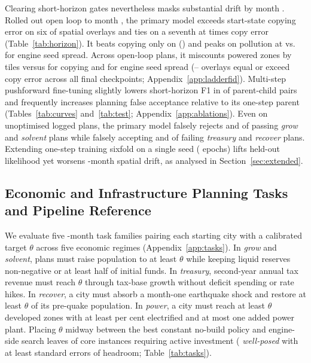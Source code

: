 Clearing short-horizon gates nevertheless masks substantial drift by month \Horizon{}. Rolled out open loop to month \Horizon{}, the primary model exceeds start-state copying error on six of \HorOverlays{} spatial overlays and ties on a seventh at \HorRestMin{} times copy error (Table~\ref{tab:horizon}). It beats copying only on \HorBestOverlay{} (\HorBestRatio{}) and peaks on pollution at \HorPollEmu{} vs.\ \HorPollEng{} for engine seed spread. Across \HorOpenPlans{} open-loop plans, it miscounts powered zones by \HorPowEmu{} tiles versus \HorPowCopy{} for copying and \HorPowEng{} for engine seed spread\ifHorizonDone{} (\HorLadGeMin{}--\HorLadGeMax{} overlays equal or exceed copy error across all \LadFinals{} final checkpoints; Appendix~\ref{app:ladderfid})\fi. Multi-step pushforward fine-tuning slightly lowers short-horizon F1 in \SfLowerOne{} of \SfPairs{} parent-child pairs and frequently increases planning false acceptance relative to its one-step parent (Tables~\ref{tab:curves} and~\ref{tab:test}; Appendix~\ref{app:ablations}). Even on \BehPlans{} unoptimised logged plans, the primary model falsely rejects \GrowBehFn{} and \SolvBehFn{} of passing \emph{grow} and \emph{solvent} plans while falsely accepting \TreasBehFp{} and \RecovBehFp{} of failing \emph{treasury} and \emph{recover} plans. Extending one-step training sixfold on a single seed (\ExtTrEpochs{} epochs) lifts held-out likelihood yet worsens \Horizon-month spatial drift, as analysed in Section~\ref{sec:extended}.

\subsection{Economic and Infrastructure Planning Tasks and Pipeline Reference}\label{sec:tasks}\label{sec:measure}

We evaluate five \Horizon-month task families pairing each starting city with a calibrated target $\theta$ across five economic regimes (Appendix~\ref{app:tasks}). In \emph{grow} and \emph{solvent}, plans must raise population to at least $\theta$ while keeping liquid reserves non-negative or at least half of initial funds. In \emph{treasury}, second-year annual tax revenue must reach $\theta$ through tax-base growth without deficit spending or rate hikes. In \emph{recover}, a city must absorb a month-one earthquake shock and restore at least $\theta$ of its pre-quake population. In \emph{power}, a city must reach at least $\theta$ developed zones with at least \PowerFrac{} per cent electrified and at most one added power plant. Placing $\theta$ midway between the best constant no-build policy and engine-side search leaves \Instances{} of \InstancesPlanned{} core instances requiring active investment (\WellPosed{} \emph{well-posed} with at least \WellPosedSE{} standard errors of headroom; Table~\ref{tab:tasks}).


